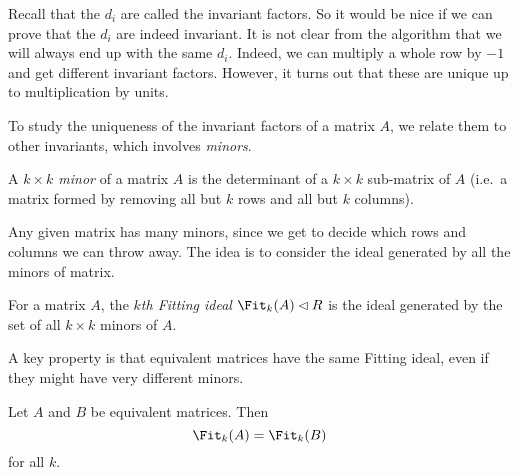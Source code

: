 \documentclass[a4paper]{article}
\begin{document}
Recall that the $d_i$ are called the invariant factors. So it would be nice if we can prove that the $d_i$ are indeed invariant. It is not clear from the algorithm that we will always end up with the same $d_i$. Indeed, we can multiply a whole row by $-1$ and get different invariant factors. However, it turns out that these are unique up to multiplication by units.

To study the uniqueness of the invariant factors of a matrix $A$, we relate them to other invariants, which involves \emph{minors}.
\begin{defi}[Minor]
  A \emph{$k \times k$ minor} of a matrix $A$ is the determinant of a $k \times k$ sub-matrix of $A$ (i.e.\ a matrix formed by removing all but $k$ rows and all but $k$ columns).
\end{defi}
Any given matrix has many minors, since we get to decide which rows and columns we can throw away. The idea is to consider the ideal generated by all the minors of matrix.

\begin{defi}
  For a matrix $A$, the \emph{$k$th Fitting ideal} $\Fit_k(A) \lhd R$ is the ideal generated by the set of all $k \times k$ minors of $A$.
\end{defi}
A key property is that equivalent matrices have the same Fitting ideal, even if they might have very different minors.

\begin{lemma}
  Let $A$ and $B$ be equivalent matrices. Then
  \[
    \Fit_k(A) = \Fit_k(B)
  \]
  for all $k$.
\end{lemma}
\end{document}
